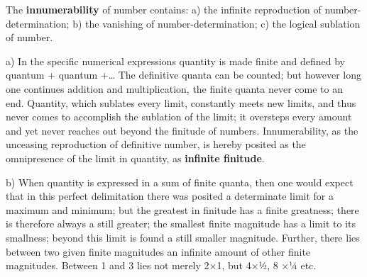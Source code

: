 \documentclass[12pt,a4paper,openany]{book}
\begin{document}
The \textbf{innumerability} of number contains: a) the infinite reproduction of number-determination; b) the
vanishing of number-determination; c) the logical sublation of number.

a) In the specific numerical expressions quantity is made finite
and defined by quantum + quantum +\dots{}
The definitive quanta can be counted; but however long
one continues addition and multiplication,
the finite quanta never come to an end. Quantity,
which sublates every limit, constantly meets new limits,
and thus never comes to accomplish the sublation of the
limit; it oversteps every amount and yet
never reaches out beyond the finitude of numbers. Innumerability,
as the unceasing reproduction of definitive number,
is hereby posited as the omnipresence of the limit in quantity, as \textbf{infinite finitude}.

b) When quantity is expressed in a sum of
finite quanta, then one would expect that in this
perfect delimitation there was posited a determinate limit
for a maximum and minimum; but the greatest in finitude has a finite greatness; there is therefore
always a still greater; the smallest finite magnitude
has a limit to its smallness; beyond this limit
is found a still smaller magnitude. Further, there lies
between two given finite magnitudes an infinite
amount of other finite magnitudes. Between 1
and 3 lies not merely 2×1, but 4×½, 8 ×¼ etc.
\end{document}
